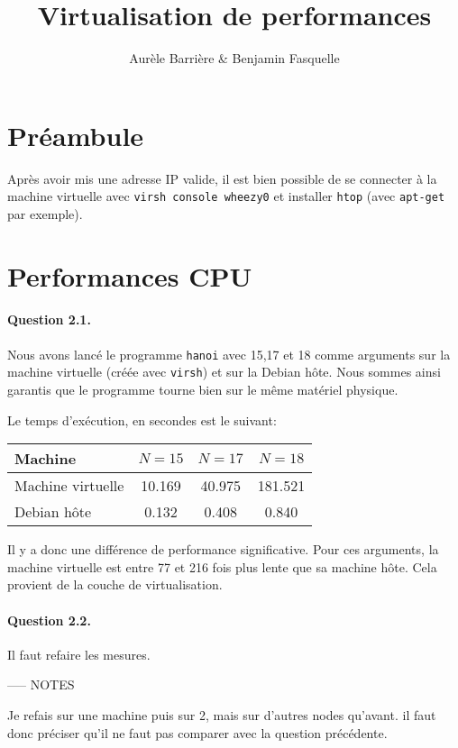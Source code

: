 \documentclass[12pt]{article}
\title{Virtualisation de performances}
\author{Aurèle Barrière \& Benjamin Fasquelle}
\begin{document}
\maketitle
\def\code#1{\texttt{#1}}

\section{Préambule}
Après avoir mis une adresse IP valide, il est bien possible de se connecter à la machine virtuelle avec \code{virsh console wheezy0} et installer \code{htop} (avec \code{apt-get} par exemple).

\section{Performances CPU}

\paragraph{Question 2.1.} Nous avons lancé le programme \texttt{hanoi} avec 15,17 et 18 comme arguments sur la machine virtuelle (créée avec \code{virsh}) et sur la Debian hôte. Nous sommes ainsi garantis que le programme tourne bien sur le même matériel physique.

Le temps d'exécution, en secondes est le suivant:

\begin{tabular}{| l | c | c | c |}\hline
Machine & $N=15$ & $N=17$ & $N=18$ \\\hline
Machine virtuelle & 10.169 & 40.975 & 181.521 \\\hline
Debian hôte & 0.132 & 0.408 & 0.840\\\hline
\end{tabular}

Il y a donc une différence de performance significative. Pour ces arguments, la machine virtuelle est entre 77 et 216 fois plus lente que sa machine hôte. Cela provient de la couche de virtualisation.

\paragraph{Question 2.2.} 
Il faut refaire les mesures.


----- NOTES

Je refais sur une machine puis sur 2, mais sur d'autres nodes qu'avant. il faut donc préciser qu'il ne faut pas comparer avec la question précédente.
\end{document}

